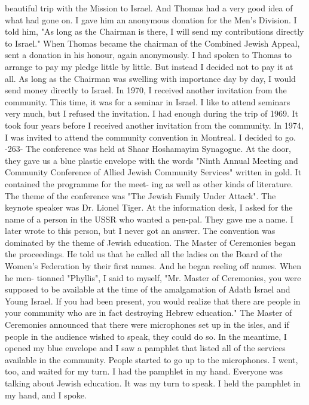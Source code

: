 beautiful trip with the Mission to Israel.
And Thomas had a very 
good idea of what had gone on.
I gave him an anonymous donation 
for the Men's Division.
I told him, "As long as the Chairman is 
there, I will send my contributions directly to Israel."
When Thomas became the chairman of the Combined Jewish Appeal, 
sent a donation in his honour, again anonymously.
I had spoken to 
Thomas to arrange to pay my pledge little by little.
But instead I 
decided not to pay it at all.
As long as the Chairman was swelling 
with importance day by day, I would send money directly to Israel.
In 1970, I received another invitation from the community.
This 
time, it was for a seminar in Israel.
I like to attend seminars very 
much, but I refused the invitation.
I had enough during the trip of 
1969.
It took four years before I received another invitation from the 
community.
In 1974, I was invited to attend the community convention 
in Montreal.
I decided to go.
-263- 
The conference was held at Shaar Hoshamayim Synagogue.
At the 
door, they gave us a blue plastic envelope with the words "Ninth 
Annual Meeting and Community Conference of Allied Jewish Community 
Services" written in gold.
It contained the programme for the meet-
ing as well as other kinds of literature.
The theme of the conference was "The Jewish Family Under Attack".
The keynote speaker was 
Dr.
Lionel Tiger.
At the information desk, I asked for the name of 
a person in the USSR who wanted a pen-pal.
They gave me a name.
I 
later wrote to this person, but I never got an answer.
The convention was dominated by the theme of Jewish education.
The Master of Ceremonies began the proceedings.
He told us that 
he called all the ladies on the Board of the Women's Federation by 
their first names.
And he began reeling off names.
When he men-
tionned "Phyllis", I said to myself, "Mr.
Master of Ceremonies, you 
were supposed to be available at the time of the amalgamation of 
Adath Israel and Young Israel.
If you had been present, you would 
realize that there are people in your community who are in fact destroying Hebrew education."
The Master of Ceremonies announced that there were microphones 
set up in the isles, and if people in the audience wished to speak, 
they could do so.
In the meantime, I opened my blue envelope and I 
saw a pamphlet that listed all of the services available in the community.
People started to go up to the microphones.
I went, too, 
and waited for my turn.
I had the pamphlet in my hand.
Everyone 
was talking about Jewish education.
It was my turn to speak.
I held the pamphlet in my hand, and I spoke.
